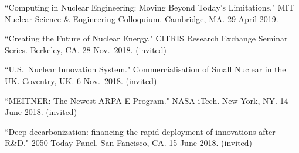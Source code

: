 \begin{bibsection}
\item ``Computing in Nuclear Engineering: Moving Beyond Today's Limitations." MIT Nuclear Science \& Engineering Colloquium. Cambridge, MA. 29 April 2019.



\item ``Creating the Future of Nuclear Energy." CITRIS Research Exchange Seminar Series. Berkeley, CA. 28 Nov.\ 2018. (invited)



\item ``U.S.\ Nuclear Innovation System." Commercialisation of Small Nuclear in the UK. Coventry, UK. 6 Nov.\ 2018. (invited)

\item ``MEITNER: The Newest ARPA-E Program." NASA iTech. New York, NY. 14 June 2018. (invited)

\item ``Deep decarbonization: financing the rapid deployment of innovations after R\&D." 2050 Today Panel. San Fancisco, CA. 15 June 2018. (invited)





\end{bibsection}
